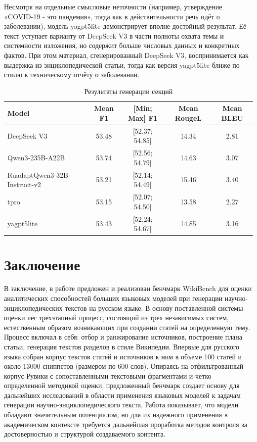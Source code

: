 \documentclass{article}
\theoremstyle{definition}
\theoremstyle{plain}
\begin{document}
Несмотря на отдельные смысловые неточности (например, утверждение «COVID-19 - это пандемия», тогда как в действительности речь идёт о заболевании), 
модель yagpt5lite демонстрирует вполне достойный результат. Её текст уступает варианту от DeepSeek V3 в части полноты охвата темы и системности изложения, 
но содержит больше числовых данных и конкретных фактов. При этом материал, сгенерированный DeepSeek V3, воспринимается как выдержка из энциклопедической статьи, 
тогда как версия yagpt5lite ближе по стилю к техническому отчёту о заболевании.


\begin{table}[ht!]
\centering
\caption{Результаты генерации секций}
\begin{tabular}{l|c|c|c|c}
\hline
\textbf{Model} & \textbf{Mean F1} & \textbf{[Min; Max] F1} & \textbf{Mean RougeL} & \textbf{Mean BLEU}\\
\hline
DeepSeek V3                  & 53.48 & [52.37; 54.85] & 14.34 & 2.81\\
Qwen3-235B-A22B              & 53.74 & [52.56; 54.79] & 14.63 & 3.07\\
RuadaptQwen3-32B-Instruct-v2 & 53.21 & [52.14; 54.49] & 15.46 & 3.40\\
tpro                         & 53.15 & [52.07; 54.50] & 13.58 & 2.27\\
yagpt5lite                   & 53.43 & [52.24; 54.67] & 14.85 & 3.16\\
\hline
\end{tabular}
\label{tab:secs}
\end{table}

\section*{Заключение}
В заключение, в работе предложен и реализован бенчмарк WikiBench для оценки аналитических способностей больших языковых моделей при генерации научно-энциклопедических текстов на русском языке.
В основу поставленной системы оценки лег трехэтапный процесс, состоящий из трех независимых систем, естественным образом возникающих при создании статей на определенную тему.
Процесс включал в себя: отбор и ранжирование источников, построение плана статьи, генерация текстов разделов в стиле Википедии.
Впервые для русского языка собран корпус текстов статей и источников к ним в объеме 100 статей и около 13000 сниппетов (размером по 600 слов). Опираясь на отфильтрованный корпус Рувики с сопоставленными текстовыми фрагментами и четко определенной методикой оценки, 
предложенный бенчмарк создает основу для дальнейших исследований в области применения языковых моделей к задачам генерации научно-энциклопедического текста. Работа показывает, что модели обладают значительным потенциалом, 
но для их надежного применения в академическом контексте требуется дальнейшая проработка методов контроля за достоверностью и структурой создаваемого контента.
\end{document}
